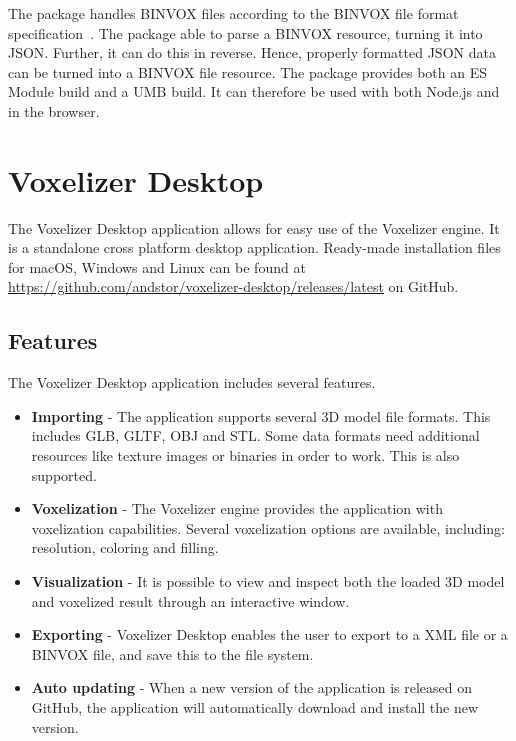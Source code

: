 The package handles BINVOX files according to the BINVOX file format specification~\cite{binvox-file-format}. The package able to parse a BINVOX resource, turning it into JSON. Further, it can do this in reverse. Hence, properly formatted JSON data can be turned into a BINVOX file resource. The package provides both an ES Module build and a UMB build. It can therefore be used with both Node.js and in the browser.

\section{Voxelizer Desktop}
The Voxelizer Desktop application allows for easy use of the Voxelizer engine. It is a standalone cross platform desktop application. Ready-made installation files for macOS, Windows and Linux can be found at \url{https://github.com/andstor/voxelizer-desktop/releases/latest} on GitHub.

\subsection{Features}
The Voxelizer Desktop application includes several features.
\begin{itemize}
    \item \textbf{Importing} - The application supports several 3D model file formats. This includes GLB, GLTF, OBJ and STL. Some data formats need additional resources like texture images or binaries in order to work. This is also supported.
    \item \textbf{Voxelization} - The Voxelizer engine provides the application with voxelization capabilities. Several voxelization options are available, including: resolution, coloring and filling.
    \item \textbf{Visualization} - It is possible to view and inspect both the loaded 3D model and voxelized result through an interactive window.
    \item \textbf{Exporting} - Voxelizer Desktop enables the user to export to a XML file or a BINVOX file, and save this to the file system.
    \item \textbf{Auto updating} - When a new version of the application is released on GitHub, the application will automatically download and install the new version.
\end{itemize}

